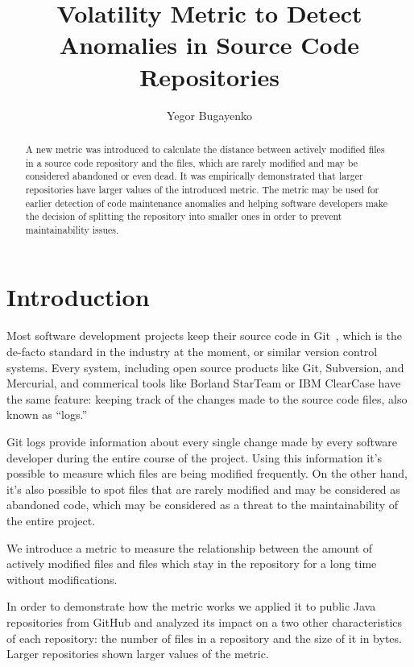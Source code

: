 \documentclass[sigconf]{acmart}
\title{Volatility Metric to Detect Anomalies in Source Code Repositories}
\author{Yegor Bugayenko}{}{}
\affiliation{%
  \institution{Huawei Technologies Co., Ltd.}
  \city{Moscow, Russia}
}
\begin{document}
\begin{abstract}
A new metric was introduced to calculate the distance
between actively modified files in a source code repository
and the files, which are rarely modified and may be considered
abandoned or even dead. It was empirically demonstrated that larger repositories
have larger values of the introduced metric.
The metric may be used for earlier detection of code maintenance anomalies
and helping software developers make the decision of splitting the repository
into smaller ones in order to prevent maintainability issues.
\end{abstract}
\maketitle

\section{Introduction}

Most software development projects keep their source code in Git~\citep{loeliger2012},
which is the de-facto standard in the industry at the moment, or similar
version control systems. Every system, including open
source products like Git, Subversion, and Mercurial, and commerical tools
like Borland StarTeam\texttrademark{} or IBM ClearCase\texttrademark{}
have the same feature: keeping track of the changes
made to the source code files, also known as ``logs.''

Git logs provide information about every single change made by every software
developer during the entire course of the project. Using this information
it's possible to measure which files are being modified frequently. On the
other hand, it's also possible to spot files that are rarely modified and may
be considered as abandoned code, which may be considered as a threat
to the maintainability of the entire project.

We introduce a metric to measure the relationship
between the amount of actively modified files and files which stay
in the repository for a long time without modifications.

In order to demonstrate how the metric works we applied it to
\thetotalrepos{} public Java repositories from GitHub and analyzed
its impact on a two other characteristics of each repository:
the number of files in a repository and the size of it in bytes.
Larger repositories shown larger values of the metric.
\end{document}
